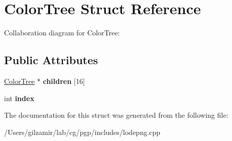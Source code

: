 \hypertarget{struct_color_tree}{}\section{Color\+Tree Struct Reference}
\label{struct_color_tree}


Collaboration diagram for Color\+Tree\+:
\subsection*{Public Attributes}
\begin{DoxyCompactItemize}
\item 
\mbox{\label{struct_color_tree_a46a3b1d9239f5fd467ec97cd067b9a96}} 
\mbox{\hyperlink{struct_color_tree}{Color\+Tree}} $\ast$ {\bfseries children} \mbox{[}16\mbox{]}
\item 
\mbox{\label{struct_color_tree_ab3836a4a5981a7cf4ef553d25d9b0361}} 
int {\bfseries index}
\end{DoxyCompactItemize}


The documentation for this struct was generated from the following file\+:\begin{DoxyCompactItemize}
\item 
/\+Users/gilzamir/lab/cg/pgp/includes/lodepng.\+cpp\end{DoxyCompactItemize}
